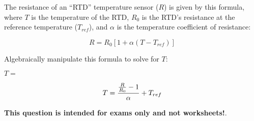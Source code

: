 

The resistance of an ``RTD'' temperature sensor ($R$) is given by this formula, where $T$ is the temperature of the RTD, $R_0$ is the RTD's resistance at the reference temperature ($T_{ref}$), and $\alpha$ is the temperature coefficient of resistance:
 
$$R = R_0 [1 + \alpha (T - T_{ref})]$$

Algebraically manipulate this formula to solve for $T$:

\vskip 20pt

$T = $







$$T = {{{R \over R_0} - 1} \over \alpha} + T_{ref}$$







{\bf This question is intended for exams only and not worksheets!}.



